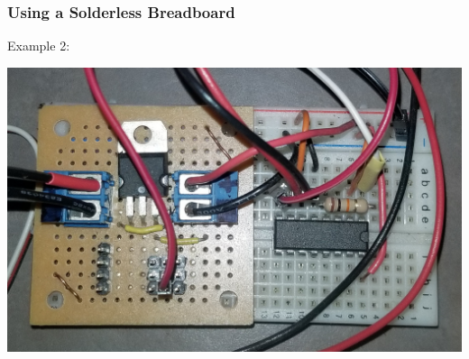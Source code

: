 \documentclass[fleqn]{beamer} %
\newcommand{\sectionIIsubsectionIItitle}{Using a Solderless Breadboard}
\begin{document}
			\begin{frame}
				\frametitle{\sectionIIsubsectionIItitle}

				Example 2:

	  			\includegraphics[scale=.1]{images/breadboard_fan_hbridge_cropped.jpg} 

			\end{frame}
\end{document}

